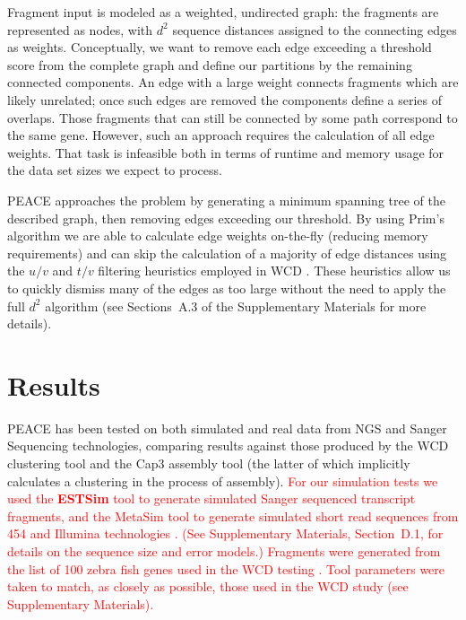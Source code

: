 \documentclass[a4,center,fleqn]{NAR}
\newcommand{\mc}[1]{\textcolor{red}{#1}}
\newcommand{\peace} {{\small PEACE}}
\newcommand{\wcd} {{\small WCD}}
\newcommand{\capthree} {{\small Cap3}}
\newcommand{\metasim} {{\small MetaSim}}
\begin{document}
Fragment input is modeled as a weighted, undirected graph: the
fragments are represented as nodes, with $d^2$ sequence distances
assigned to the connecting edges as weights.  Conceptually, we want to
remove each edge exceeding a threshold score from the complete graph
and define our partitions by the remaining connected components.  An
edge with a large weight connects fragments which are likely
unrelated; once such edges are removed the components define a series
of overlaps.  Those fragments that can still be connected by some path
correspond to the same gene.  However, such an approach requires the
calculation of all edge weights.  That task is infeasible both in terms
of runtime and memory usage for the data set sizes we expect to process.

\peace\/ approaches the problem by generating a minimum spanning tree of the
described graph, then removing edges exceeding our threshold.  By
using Prim's algorithm we are able to calculate edge weights
on-the-fly (reducing memory requirements) and can skip the
calculation of a majority of edge distances using the $u/v$ and $t/v$
filtering heuristics employed in \wcd\/ \cite{Hazelhurst08a}.
These heuristics allow us to quickly dismiss many of the edges as too
large without the need to apply the full $d^2$ algorithm (see
Sections~A.3 of the Supplementary Materials for more details). 

\section{Results}

\peace\/ has been tested on both simulated and real data from NGS and
Sanger Sequencing technologies, comparing results against those
produced by the \wcd\/ clustering tool \cite{Hazelhurst08a} and the
\capthree\/ assembly tool \cite{Huang99} (the latter of which
implicitly calculates a clustering in the process of assembly).
\mc{For our simulation tests we used the {\bf ESTSim} tool to generate
  simulated Sanger sequenced transcript fragments, and the \metasim\/
  tool to generate simulated short read sequences from 454 and Illumina
  technologies \cite{Hazelhurst03,Richter2008}.  (See Supplementary
  Materials, Section~D.1, for details on the sequence size and error
  models.)  Fragments were generated from the list of 100 zebra fish
  genes used in the \wcd\/ testing \cite{Hazelhurst08a}.  Tool
  parameters were taken to match, as closely as possible, those used
  in the \wcd\/ study (see Supplementary Materials).  }
\end{document}
